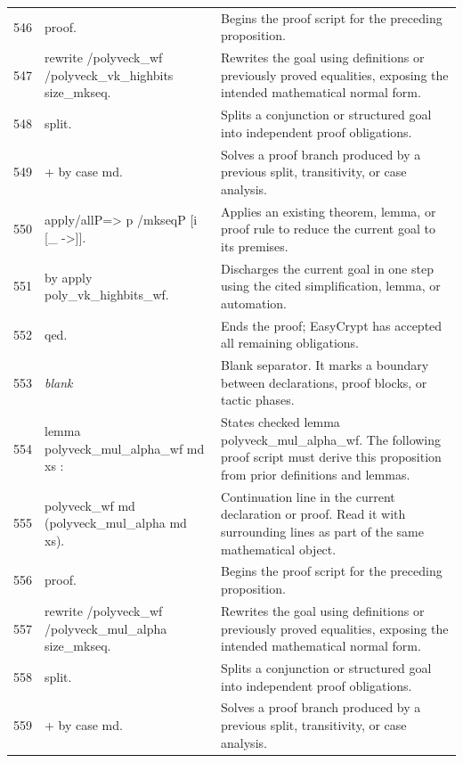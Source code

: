\documentclass[10pt]{article}
\begin{document}
\begin{longtable}{r L{0.53\textwidth} L{0.37\textwidth}}
546 & {\ttfamily\scriptsize proof.} & Begins the proof script for the preceding proposition. \\
547 & {\ttfamily\scriptsize rewrite /polyveck\_wf /polyveck\_vk\_highbits size\_mkseq.} & Rewrites the goal using definitions or previously proved equalities, exposing the intended mathematical normal form. \\
548 & {\ttfamily\scriptsize split.} & Splits a conjunction or structured goal into independent proof obligations. \\
549 & {\ttfamily\scriptsize + by case md.} & Solves a proof branch produced by a previous split, transitivity, or case analysis. \\
550 & {\ttfamily\scriptsize apply/allP=> p /mkseqP [i [\_ ->]].} & Applies an existing theorem, lemma, or proof rule to reduce the current goal to its premises. \\
551 & {\ttfamily\scriptsize by apply poly\_vk\_highbits\_wf.} & Discharges the current goal in one step using the cited simplification, lemma, or automation. \\
552 & {\ttfamily\scriptsize qed.} & Ends the proof; EasyCrypt has accepted all remaining obligations. \\
553 & {\ttfamily\scriptsize \emph{blank}} & Blank separator.  It marks a boundary between declarations, proof blocks, or tactic phases. \\
554 & {\ttfamily\scriptsize lemma polyveck\_mul\_alpha\_wf md xs :} & States checked lemma polyveck\_mul\_alpha\_wf.  The following proof script must derive this proposition from prior definitions and lemmas. \\
555 & {\ttfamily\scriptsize   polyveck\_wf md (polyveck\_mul\_alpha md xs).} & Continuation line in the current declaration or proof.  Read it with surrounding lines as part of the same mathematical object. \\
556 & {\ttfamily\scriptsize proof.} & Begins the proof script for the preceding proposition. \\
557 & {\ttfamily\scriptsize rewrite /polyveck\_wf /polyveck\_mul\_alpha size\_mkseq.} & Rewrites the goal using definitions or previously proved equalities, exposing the intended mathematical normal form. \\
558 & {\ttfamily\scriptsize split.} & Splits a conjunction or structured goal into independent proof obligations. \\
559 & {\ttfamily\scriptsize + by case md.} & Solves a proof branch produced by a previous split, transitivity, or case analysis. \\

\end{longtable}
\end{document}
